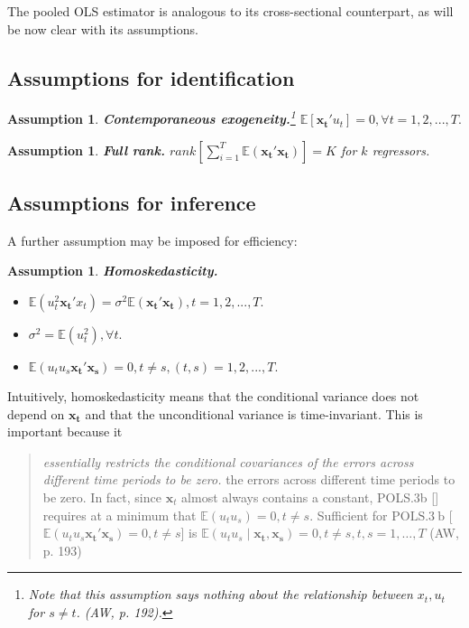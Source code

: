 \documentclass[11pt, a4paper]{report}
\theoremstyle{plain}
\newtheorem{assump}[thm]{Assumption}
\theoremstyle{plain}
\theoremstyle{remark}
\begin{document}
The pooled OLS estimator is analogous to its cross-sectional counterpart, as will be now clear with its assumptions. 

\subsection{Assumptions for identification}

\begin{assump} \label{contemp_exog} \textbf{Contemporaneous exogeneity.}\footnote{Note that this assumption says nothing about the relationship between $x_t, u_t$ for $s \neq t$. (AW, p. 192).}
$\mathbb{E}[\mathbf{x_t}'u_t] = 0, \forall t = 1, 2, ..., T.$ 
\end{assump}

\begin{assump} \label{full_rank} \textbf{Full rank.}
    $rank[\sum_{i=1}^T \mathbb{E}(\mathbf{x_t'x_t})] = K$ for $k$ regressors.
\end{assump}


\subsection{Assumptions for inference}

A further assumption may be imposed for efficiency:
\begin{assump} \label{homosk} \textbf{Homoskedasticity.}
    \begin{itemize}
        \item $\mathbb{E}(u_t^2 \mathbf{x_t}'x_t) = \sigma^2 \mathbb{E}(\mathbf{x_t'x_t}), t = 1,2,...,T.$
        \item $\sigma^2 = \mathbb{E}(u_t^2), \forall t.$
        \item $\mathbb{E}(u_t u_s \mathbf{x_t'x_s}) = 0, t \neq s, (t,s) = 1,2,...,T.$
    \end{itemize}
\end{assump}

Intuitively, homoskedasticity means that the conditional variance does not depend on $\mathbf{x_t}$ and that the unconditional variance is time-invariant. This is important because it 
\begin{quote}
\textit{essentially restricts the conditional covariances of the errors across different time periods to be zero.} the errors across different time periods to be zero. In fact, since $\mathbf{x}_{t}$ almost always contains a constant, POLS.3b [] requires at a minimum that $\mathbb{E}\left(u_{t} u_{s}\right)=0, t \neq s$. Sufficient for $\mathrm{POLS.} 3\mathrm{~b}$ [$\mathbb{E}(u_t u_s \mathbf{x_t'x_s}) = 0, t \neq s$] is $\mathbb{E}\left(u_{t} u_{s} \mid \mathbf{x_{t}, x_{s}}\right)=0, t \neq s, t, s=1, \ldots, T$ (AW, p. 193)
\end{quote}
\end{document}
